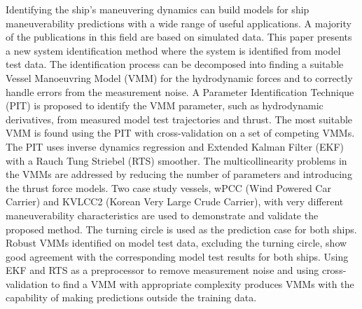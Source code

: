 Identifying the ship's maneuvering dynamics can build models for ship maneuverability predictions
with a wide range of useful applications. A majority of the publications in this field are based on
simulated data. This paper presents a new system identification method where the system is
identified from model test data. The identification process can be decomposed into finding a suitable
Vessel Manoeuvring Model (VMM) for the hydrodynamic forces and to correctly handle errors from the
measurement noise. A Parameter Identification Technique (PIT) is proposed to identify the VMM parameter, 
such as hydrodynamic derivatives, from measured model test trajectories and thrust. The most suitable VMM
is found using the PIT with cross-validation on a set of competing VMMs. The PIT uses inverse
dynamics regression and Extended Kalman Filter (EKF) with a Rauch Tung Striebel (RTS) smoother. The
multicollinearity problems in the VMMs are addressed by reducing the number of parameters and introducing
the thrust force models. Two case study vessels, wPCC (Wind Powered Car Carrier) and KVLCC2 (Korean Very Large Crude Carrier), with very different maneuverability
characteristics are used to demonstrate and validate the proposed method. The turning circle is used as the
prediction case for both ships. Robust VMMs identified on model test data, excluding the turning circle, show
good agreement with the corresponding model test results for both ships. Using EKF and RTS as a
preprocessor to remove measurement noise and using cross-validation to find a VMM with appropriate
complexity produces VMMs with the capability of making predictions outside the training data.
